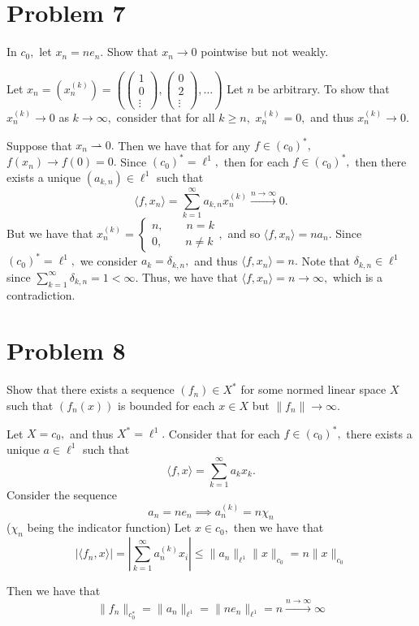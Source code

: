 \documentclass[11pt]{article}
\begin{document}
\section*{Problem 7}
\begin{problem}
    In $c_0,$ let $x_n =n e_n.$ Show that $x_n \to 0$ pointwise but not weakly. 
\end{problem}
\begin{solution}
    Let $x_n = (x_n^{(k)}) = 
    \left(\begin{pmatrix}
        1 \\ 0 \\ \vdots
    \end{pmatrix}, \begin{pmatrix}
        0 \\ 2 \\ \vdots
    \end{pmatrix}, \dots\right)$ Let $n$ be arbitrary. To show that $x_n^{(k)}\to 0$ as $k\to \infty,$ consider that for all $k\geq n,$ $x_{n}^{(k)} = 0,$ and thus $x_n^{(k)}\to 0.$

    Suppose that $x_n\rightharpoonup 0.$ Then we have that for any $f\in (c_0)^*,$ $f(x_n) \to f(0) = 0.$ Since $(c_0)^* = \ell^1,$ then for each $f\in (c_0)^*,$ then there exists a unique $(a_{k,n})\in \ell^1$ such that
    \[\langle f, x_n \rangle = \sum_{k=1}^\infty  a_{k,n} x_{n}^{(k)} \xrightarrow{n\to \infty} 0.\] But we have that $x_{n}^{(k)} = \begin{cases}
        n, \qquad n=k\\
        0, \qquad n\neq k
    \end{cases},$ and so $\langle f, x_n \rangle = na_n.$ Since $(c_0)^* = \ell^1,$ we consider $a_{k} = \delta_{k,n},$ and thus $\langle f, x_n \rangle = n.$ Note that $\delta_{k,n} \in \ell^1$ since $\sum_{k=1}^\infty \delta_{k,n} = 1 < \infty.$ Thus, we have that $\langle f, x_n \rangle = n \to \infty,$ which is a contradiction. 
\end{solution}

\newpage

\section*{Problem 8}
\begin{problem}
    Show that there exists a sequence $(f_n) \in X^*$ for some normed linear space $X$ such that $(f_n(x))$ is bounded for each $x \in X$ but $\|f_n\|\to \infty.$ 
\end{problem}
\begin{solution}
    Let $X = c_0,$ and thus $X^*= \ell^1.$ Consider that for each $f\in (c_0)^*,$ there exists a unique $a\in \ell^1$ such that
    \[\langle f, x\rangle = \sum_{k=1}^\infty a_kx_k.\] Consider the sequence 
    \[a_n = ne_n \implies a_{n}^{(k)} = n\chi_n \] ($\chi_n$ being the indicator function) Let $x\in c_0,$ then we have that 
    \[|\langle f_n, x\rangle| = |\sum_{k=1}^\infty a_{n}^{(k)}x_i| \leq \|a_n\|_{\ell^1}\|x\|_{c_0} = n\|x\|_{c_0}\]
    
    
    Then we have that 
    \[\|f_n\|_{c_0^*} = \|a_n\|_{\ell^1} = \|ne_n\|_{\ell^1} = n \xrightarrow{n\to \infty} \infty\]
\end{solution}
\newpage
\end{document}
